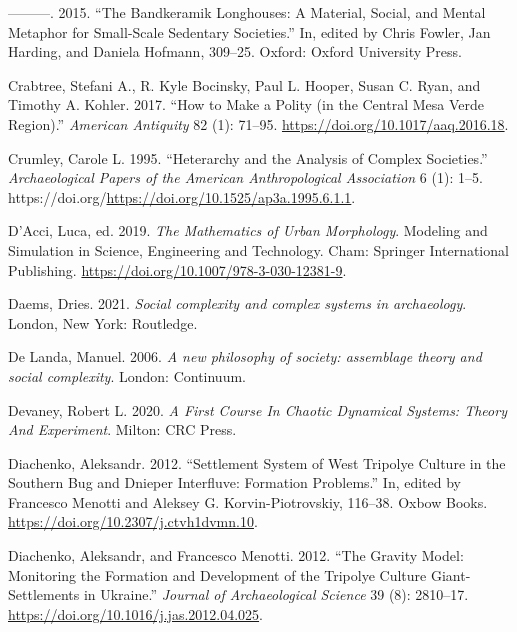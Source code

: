 \documentclass[
  12pt,
  a4paper, twoside]{book}
\newlength{\cslhangindent}
\newlength{\cslentryspacingunit} %
\newenvironment{CSLReferences}[2] %
 {%
  \setlength{\parindent}{0pt}
  \ifodd #1
  \let\oldpar\par
  \def\par{\hangindent=\cslhangindent\oldpar}
  \fi
  \setlength{\parskip}{#2\cslentryspacingunit}
 }%
 {}
\begin{document}
\begin{CSLReferences}{1}{0}
\leavevmode{}%
---------. 2015. {``The Bandkeramik Longhouses: A Material, Social, and Mental Metaphor for Small-Scale Sedentary Societies.''} In, edited by Chris Fowler, Jan Harding, and Daniela Hofmann, 309--25. Oxford: Oxford University Press.

\leavevmode{}%
Crabtree, Stefani A., R. Kyle Bocinsky, Paul L. Hooper, Susan C. Ryan, and Timothy A. Kohler. 2017. {``How to Make a Polity (in the Central Mesa Verde Region).''} \emph{American Antiquity} 82 (1): 71--95. \url{https://doi.org/10.1017/aaq.2016.18}.

\leavevmode{}%
Crumley, Carole L. 1995. {``Heterarchy and the Analysis of Complex Societies.''} \emph{Archaeological Papers of the American Anthropological Association} 6 (1): 1--5. https://doi.org/\url{https://doi.org/10.1525/ap3a.1995.6.1.1}.

\leavevmode{}%
D'Acci, Luca, ed. 2019. \emph{The Mathematics of Urban Morphology}. Modeling and Simulation in Science, Engineering and Technology. Cham: Springer International Publishing. \url{https://doi.org/10.1007/978-3-030-12381-9}.

\leavevmode{}%
Daems, Dries. 2021. \emph{Social complexity and complex systems in archaeology}. London, New York: Routledge.

\leavevmode{}%
De Landa, Manuel. 2006. \emph{A new philosophy of society: assemblage theory and social complexity}. London: Continuum.

\leavevmode{}%
Devaney, Robert L. 2020. \emph{A First Course In Chaotic Dynamical Systems: Theory And Experiment}. Milton: CRC Press.

\leavevmode{}%
Diachenko, Aleksandr. 2012. {``Settlement System of West Tripolye Culture in the Southern Bug and Dnieper Interfluve: Formation Problems.''} In, edited by Francesco Menotti and Aleksey G. Korvin-Piotrovskiy, 116--38. Oxbow Books. \url{https://doi.org/10.2307/j.ctvh1dvmn.10}.

\leavevmode{}%
Diachenko, Aleksandr, and Francesco Menotti. 2012. {``The Gravity Model: Monitoring the Formation and Development of the Tripolye Culture Giant-Settlements in Ukraine.''} \emph{Journal of Archaeological Science} 39 (8): 2810--17. \url{https://doi.org/10.1016/j.jas.2012.04.025}.


\end{CSLReferences}
\end{document}

